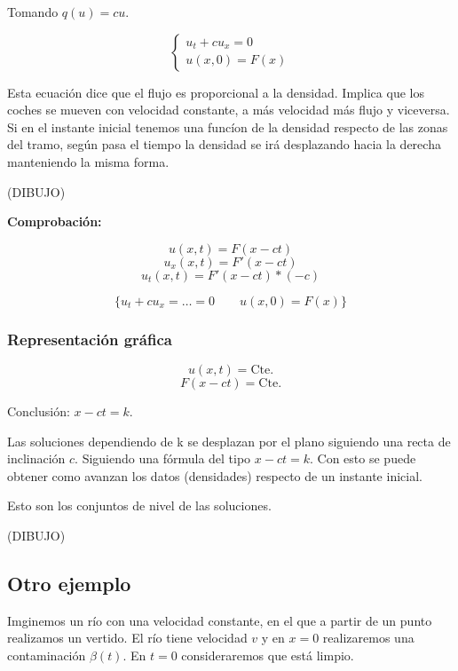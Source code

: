 			Tomando $q(u) = cu$.

			\begin{equation*}
			\left\{
			\begin{array}{l}
			u_t + cu_x = 0 \\
			u(x,0) = F(x)
			\end{array}
			\right.
			\end{equation*}



			Esta ecuación dice que el flujo es proporcional a la densidad. Implica que los coches se mueven con velocidad constante, a más velocidad más flujo y viceversa. Si en el instante inicial tenemos una funcíon de la densidad respecto de las zonas del tramo, según pasa el tiempo la densidad se irá desplazando hacia la derecha manteniendo la misma forma.

			(DIBUJO)

			\textbf{Comprobación:}

			$$ u(x,t) = F(x-ct) $$
			$$ u_x(x,t) = F'(x-ct)$$
			$$u_t(x,t) = F'(x-ct)*(-c)$$

			$$ \{ u_t + cu_x = … = 0 \quad\quad u(x,0) = F(x) \} $$

		\subsubsection{Representación gráfica}


			$$u(x,t) = \text{Cte.}$$
			$$F(x - ct) = \text{Cte.}$$

			Conclusión: $x-ct = k$.


			Las soluciones dependiendo de k se desplazan por el plano siguiendo una recta de inclinación $c$. Siguiendo una fórmula del tipo $x-ct = k$. Con esto se puede obtener como avanzan los datos (densidades) respecto de un instante inicial.

			Esto son los conjuntos de nivel de las soluciones.

			(DIBUJO)



	\subsection{Otro ejemplo}

		Imginemos un río con una velocidad constante, en el que a partir de un punto realizamos un vertido. El río tiene velocidad $v$ y en $x=0$ realizaremos una contaminación $\beta(t)$. En $t=0$ consideraremos que está limpio.

